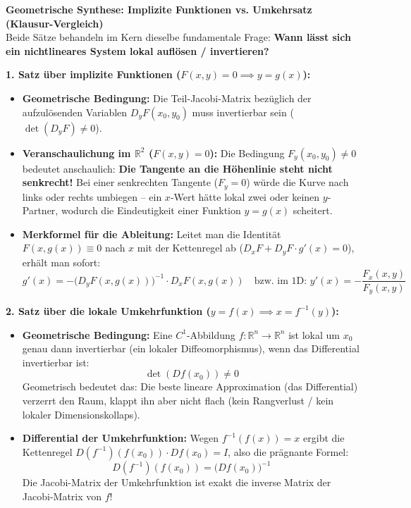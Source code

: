 \begin{remark}
    \textbf{Geometrische Synthese: Implizite Funktionen vs. Umkehrsatz (Klausur-Vergleich)} \\
    Beide Sätze behandeln im Kern dieselbe fundamentale Frage: \textbf{Wann lässt sich ein nichtlineares System lokal auflösen / invertieren?}

    \textbf{1. Satz über implizite Funktionen ($F(x, y) = 0 \implies y = g(x)$):}
    \begin{itemize}
        \item \textbf{Geometrische Bedingung:} Die Teil-Jacobi-Matrix bezüglich der aufzulösenden Variablen $D_y F(x_0, y_0)$ muss invertierbar sein ($\det(D_y F) \neq 0$).
        \item \textbf{Veranschaulichung im $\mathbb{R}^2$ ($F(x, y) = 0$):} Die Bedingung $F_y(x_0, y_0) \neq 0$ bedeutet anschaulich: \textbf{Die Tangente an die Höhenlinie steht nicht senkrecht!} Bei einer senkrechten Tangente ($F_y = 0$) würde die Kurve nach links oder rechts umbiegen – ein $x$-Wert hätte lokal zwei oder keinen $y$-Partner, wodurch die Eindeutigkeit einer Funktion $y = g(x)$ scheitert.
        \item \textbf{Merkformel für die Ableitung:} Leitet man die Identität $F(x, g(x)) \equiv 0$ nach $x$ mit der Kettenregel ab ($D_x F + D_y F \cdot g'(x) = 0$), erhält man sofort:
        $$ g'(x) = - \big( D_y F(x, g(x)) \big)^{-1} \cdot D_x F(x, g(x)) \quad \text{bzw. im 1D: } y'(x) = -\frac{F_x(x, y)}{F_y(x, y)} $$
    \end{itemize}

    \textbf{2. Satz über die lokale Umkehrfunktion ($y = f(x) \implies x = f^{-1}(y)$):}
    \begin{itemize}
        \item \textbf{Geometrische Bedingung:} Eine $C^1$-Abbildung $f: \mathbb{R}^n \to \mathbb{R}^n$ ist lokal um $x_0$ genau dann invertierbar (ein lokaler Diffeomorphismus), wenn das Differential invertierbar ist:
        $$ \det(Df(x_0)) \neq 0 $$
        Geometrisch bedeutet das: Die beste lineare Approximation (das Differential) verzerrt den Raum, klappt ihn aber nicht flach (kein Rangverlust / kein lokaler Dimensionskollaps).
        \item \textbf{Differential der Umkehrfunktion:} Wegen $f^{-1}(f(x)) = x$ ergibt die Kettenregel $D(f^{-1})(f(x_0)) \cdot Df(x_0) = I$, also die prägnante Formel:
        $$ D(f^{-1})(f(x_0)) = \big( Df(x_0) \big)^{-1} $$
        Die Jacobi-Matrix der Umkehrfunktion ist exakt die inverse Matrix der Jacobi-Matrix von $f$!
    \end{itemize}
\end{remark}

